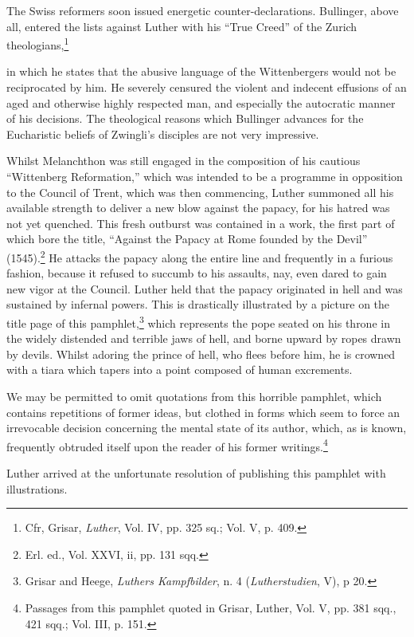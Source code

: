 The Swiss reformers soon issued energetic counter-declarations.
Bullinger, above all, entered the lists against Luther with his “True
Creed” of the Zurich theologians,\footnote{Cfr, Grisar, \textit{Luther}, Vol. IV, pp. 325 sq.; Vol. V, p. 409.}

in which he states that the abusive
language of the Wittenbergers would not be reciprocated by him. He
severely censured the violent and indecent effusions of an aged and
otherwise highly respected man, and especially the autocratic manner
of his decisions. The theological reasons which Bullinger advances for
the Eucharistic beliefs of Zwingli’s disciples are not very impressive.

Whilst Melanchthon was still engaged in the composition of his
cautious “Wittenberg Reformation,” which was intended to be a
programme in opposition to the Council of Trent, which was then
commencing, Luther summoned all his available strength to deliver
a new blow against the papacy, for his hatred was not yet quenched.
This fresh outburst was contained in a work, the first part of which
bore the title, “Against the Papacy at Rome founded by the Devil”
(1545).\footnote{Erl. ed., Vol. XXVI, ii, pp. 131 sqq.}
 He attacks the papacy along the entire line and frequently
in a furious fashion, because it refused to succumb to his assaults,
nay, even dared to gain new vigor at the Council. Luther held that
the papacy originated in hell and was sustained by infernal powers.
This is drastically illustrated by a picture on the title page of this
pamphlet,\footnote{Grisar and Heege, \textit{Luthers Kampfbilder}, n. 4 (\textit{Lutherstudien}, V), p 20.}
 which represents the pope seated on his throne in the
widely distended and terrible jaws of hell, and borne upward by ropes
drawn by devils. Whilst adoring the prince of hell, who flees before
him, he is crowned with a tiara which tapers into a point composed of
human excrements.

We may be permitted to omit quotations from this horrible pamphlet,
which contains repetitions of former ideas, but clothed in forms
which seem to force an irrevocable decision concerning the mental
state of its author, which, as is known, frequently obtruded itself
upon the reader of his former writings.\footnote
{Passages from this pamphlet quoted in Grisar, Luther, Vol. V, pp. 381 sqq., 421 sqq.;
Vol. III, p. 151.}

Luther arrived at the unfortunate resolution of publishing this
pamphlet with illustrations.


